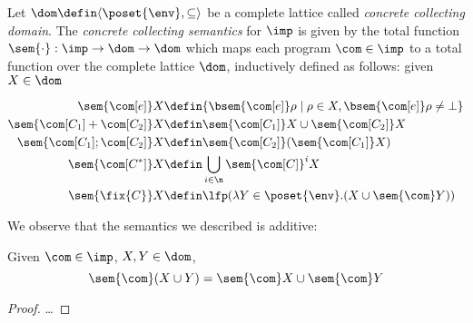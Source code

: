 \begin{definition}\label{de:concretesem}
  Let \(\dom \defin \langle \poset{\env} , \subseteq \rangle\) be a
  complete lattice called \emph{concrete collecting domain}. The
  \emph{concrete collecting semantics} for \(\imp\) is given by the
  total function \(\sem{\cdot} : \imp \to \dom \to \dom\) which maps
  each program \(\com \in \imp\) to a total function over the complete
  lattice \(\dom\), inductively defined as follows: given
  \(X \in \dom\)

  \begin{align*}
    \sem{\com[e]} X & \defin \{\bsem{\com[e]} \rho \mid \rho \in X,
                      \bsem{\com[e]} \rho \neq \bot\} \\
    \sem{\com[C_1] + \com[C_2]} X & \defin \sem{\com[C_1]} X \cup \sem{\com[C_2]} X \\
    \sem{\com[C_1] ; \com[C_2]} X & \defin \sem{\com[C_2]}(\sem{\com[C_1]} X) \\
    \sem{\com[C^*]} X & \defin \bigcup_{i \in \n} \sem{\com[C]}^i X \\
    \sem{\fix{C}} X & \defin \lfp(\lambda Y \in\poset{\env} . (X \cup \sem{\com}Y))
  \end{align*}
\end{definition}

We observe that the semantics we described is additive:

\begin{observation}
  Given \(\com\in\imp\), \(X,Y \in \dom\),
  \[\sem{\com}(X\cup Y) = \sem{\com}X \cup \sem{\com}Y\]
\end{observation}

\begin{proof}
  \dots
\end{proof}


